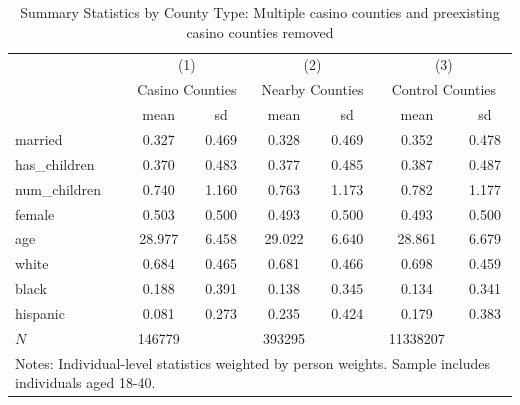 \begin{table}[htbp]\centering
\def\sym#1{\ifmmode^{#1}\else\(^{#1}\)\fi}
\caption{Summary Statistics by County Type: Multiple casino counties and preexisting casino counties removed}
\begin{tabular}{l*{3}{cc}}
\hline\hline
            &\multicolumn{2}{c}{(1)}  &\multicolumn{2}{c}{(2)}  &\multicolumn{2}{c}{(3)}  \\
            &\multicolumn{2}{c}{Casino Counties}&\multicolumn{2}{c}{Nearby Counties}&\multicolumn{2}{c}{Control Counties}\\
            &        mean&          sd&        mean&          sd&        mean&          sd\\
\hline
married     &       0.327&       0.469&       0.328&       0.469&       0.352&       0.478\\
has\_children&       0.370&       0.483&       0.377&       0.485&       0.387&       0.487\\
num\_children&       0.740&       1.160&       0.763&       1.173&       0.782&       1.177\\
female      &       0.503&       0.500&       0.493&       0.500&       0.493&       0.500\\
age         &      28.977&       6.458&      29.022&       6.640&      28.861&       6.679\\
white       &       0.684&       0.465&       0.681&       0.466&       0.698&       0.459\\
black       &       0.188&       0.391&       0.138&       0.345&       0.134&       0.341\\
hispanic    &       0.081&       0.273&       0.235&       0.424&       0.179&       0.383\\
\hline
\(N\)       &      146779&            &      393295&            &    11338207&            \\
\hline\hline
\multicolumn{7}{l}{\footnotesize Notes: Individual-level statistics weighted by person weights. Sample includes individuals aged 18-40.}\\
\end{tabular}
\end{table}
